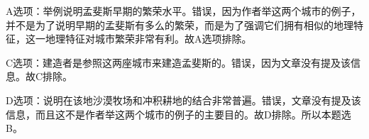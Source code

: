 \begin{blk}
\begin{nlz}
        A选项：举例说明孟斐斯早期的繁荣水平。错误，因为作者举这两个城市的例子，并不是为了说明早期的孟斐斯有多么的繁荣，而是为了强调它们拥有相似的地理特征，这一地理特征对城市繁荣非常有利。故A选项排除。

        C选项：建造者是参照这两座城市来建造孟斐斯的。错误，因为文章没有提及该信息。故C排除。

        D选项：说明在该地沙漠牧场和冲积耕地的结合非常普遍。错误，文章没有提及该信息，而且这不是作者举这两个城市的例子的主要目的。故D排除。所以本题选B。
    \end{nlz}
\end{blk}

